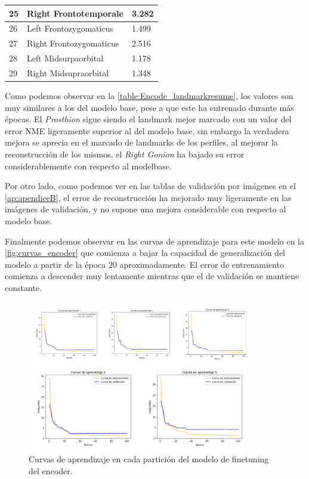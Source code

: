 \begin{table}[!ht]
\begin{tabular}{|l|l|l|}
                25 & Right Frontotemporale & 3.282 \\ \hline
                26 & Left Frontozygomaticus & 1.499 \\ \hline
                27 & Right Frontozygomaticus & 2.516 \\ \hline
                28 & Left Midsurpaorbital & 1.178 \\ \hline
                29 & Right Midsupraorbital & 1.348 \\ \hline
            \end{tabular}
            \label{table:Encode_landmarkresume}
        \end{table}
    
    \noindent Como podemos observar en la \autoref{table:Encode_landmarkresume}, los valores son muy similares a los del modelo base, pese a que este ha entrenado durante más épocas. El \textit{Prosthion} sigue siendo el landmark mejor marcado con un valor del error NME ligeramente superior al del modelo base, sin embargo la verdadera mejora se aprecia en el marcado de landmarks de los perfiles, al mejorar la reconstrucción de los mismos, el \textit{Right Gonion} ha bajado su error considerablemente con respecto al modelbase.
    
    \medskip
    
    \noindent Por otro lado, como podemos ver en las tablas de validación por imágenes en el \autoref{ap:apendiceB}, el error de reconstrucción ha mejorado muy ligeramente en las imágenes de validación, y no supone una mejora considerable con respecto al modelo base. 

    \medskip

    \noindent Finalmente podemos observar en las curvas de aprendizaje para este modelo en la \autoref{fig:curvas_encoder} que comienza a bajar la capacidad de generalización del modelo a partir de la época 20 aproximadamente. El error de entrenamiento comienza a descender muy lentamente mientras que el de validación se mantiene constante.

    \begin{figure}[!h]
        \centering
        \includegraphics[width=0.9\textwidth]{img/curvas_encoder.png}
        \caption{Curvas de aprendizaje en cada partición del modelo de finetuning del encoder.}
        \label{fig:curvas_encoder}
    \end{figure}

